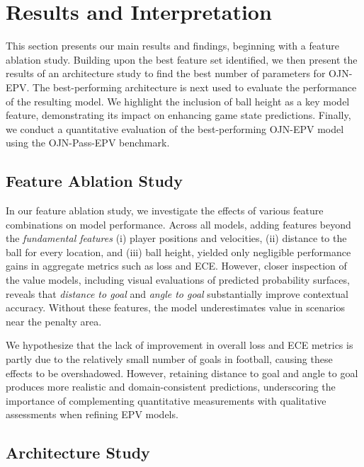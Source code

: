 \section{Results and Interpretation}
This section presents our main results and findings, beginning with a feature ablation study. Building upon the best feature set identified, we then present the results of an architecture study to find the best number of parameters for OJN-EPV. The best-performing architecture is next used to evaluate the performance of the resulting model. We highlight the inclusion of ball height as a key model feature, demonstrating its impact on enhancing game state predictions. Finally, we conduct a quantitative evaluation of the best-performing OJN-EPV model using the OJN-Pass-EPV benchmark.

\subsection{Feature Ablation Study}\label{ablation_study}

In our feature ablation study, we investigate the effects of various feature combinations on model performance. Across all models, adding features beyond the \textit{fundamental features} (i) player positions and velocities, (ii) distance to the ball for every location, and (iii) ball height, yielded only negligible performance gains in aggregate metrics such as loss and ECE. However, closer inspection of the value models, including visual evaluations of predicted probability surfaces, reveals that \textit{distance to goal} and \textit{angle to goal} substantially improve contextual accuracy. Without these features, the model underestimates value in scenarios near the penalty area.

We hypothesize that the lack of improvement in overall loss and ECE metrics is partly due to the relatively small number of goals in football, causing these effects to be overshadowed. However, retaining distance to goal and angle to goal produces more realistic and domain-consistent predictions, underscoring the importance of complementing quantitative measurements with qualitative assessments when refining EPV models.


\subsection{Architecture Study}

